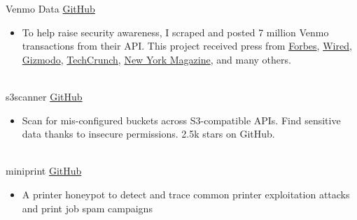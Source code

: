 \documentclass[a4paper]{twentysecondcv} %
\begin{document}
\begin{twenty}
    
    \twentyitem
    	{\hspace{10mm} \Large \faMoney}
		{}
        {Venmo Data}
        {\href{https://github.com/sa7mon/venmo-data}{GitHub}}
        {\vspace{-2mm}}
        {\begin{itemize}
        \item To help raise security awareness, I scraped and posted 7 million Venmo transactions from their API. This project received press from \href{https://www.forbes.com/sites/kevinmurnane/2019/06/17/venmo-opens-your-transaction-history-to-anyone-who-wants-to-look-heres-how-to-fix-it/}{Forbes}, \href{https://www.wired.com/story/i-scraped-millions-of-venmo-payments-your-data-is-at-risk/}{Wired}, \href{https://gizmodo.com/millions-of-transactions-scraped-in-latest-demonstratio-1835587886}{Gizmodo}, \href{https://techcrunch.com/2019/06/16/millions-venmo-transactions-scraped/}{TechCrunch}, \href{https://nymag.com/intelligencer/2019/06/venmo-payments-should-be-private.html}{New York Magazine}, and many others.
        \end{itemize}}
    \\
    \twentyitem
    	{\hspace{10mm} \Large \faDatabase}
		{}
        {s3scanner}
        {\href{https://github.com/sa7mon/s3scanner}{GitHub}}
        {\vspace{-2mm}}
        {\begin{itemize}
        \item Scan for mis-configured buckets across S3-compatible APIs. Find sensitive data thanks to insecure permissions. 2.5k stars on GitHub.
        \end{itemize}}
    \\
    \twentyitem
    	{\hspace{10mm} \Large \faPrint}
		{}
        {miniprint}
        {\href{https://github.com/sa7mon/miniprint}{GitHub}}
        {\vspace{-2mm}}
        {\begin{itemize}
        \item A printer honeypot to detect and trace common printer exploitation attacks and print job spam campaigns
        \end{itemize}}
    \\

\end{twenty}
\end{document}
